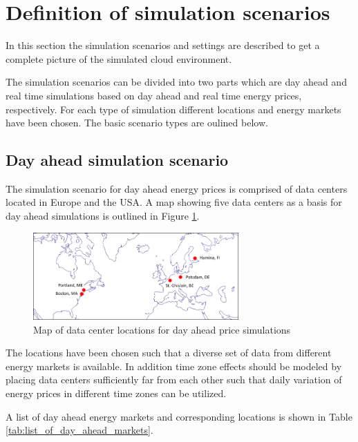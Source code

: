 

\section{Definition of simulation scenarios} \label{sec:definition_of_simulation_scenarios}

In this section the simulation scenarios and settings are described to get a complete picture of the simulated cloud environment. 

The simulation scenarios can be divided into two parts which are day ahead and real time simulations based on day ahead and real time energy prices, respectively. For each type of simulation different locations and energy markets have been chosen. The basic scenario types are oulined below. 


\subsection{Day ahead simulation scenario}

The simulation scenario for day ahead energy prices is comprised of data centers located in Europe and the USA. A map showing five data centers as a basis for day ahead simulations is outlined in Figure \ref{fig:usa_europe_map}. 

\begin{figure}[htbp]
	\centering
		\includegraphics[width=0.7\textwidth]{figures/evaluation_and_results/usa_europe_map.png}
	\caption{Map of data center locations for day ahead price simulations}
	\label{fig:usa_europe_map}
\end{figure}

The locations have been chosen such that a diverse set of data from different energy markets is available. In addition time zone effects should be modeled by placing data centers sufficiently far from each other such that daily variation of energy prices in different time zones can be utilized. 

A list of day ahead energy markets and corresponding locations is shown in Table \ref{tab:list_of_day_ahead_markets}. 


